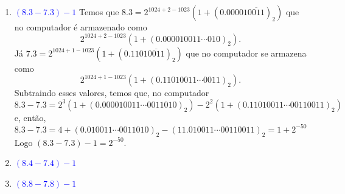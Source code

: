 \documentclass[a4paper,12pt]{article}
\theoremstyle{exer}
\theoremstyle{definition}
\newcommand{\enu}[1]{\textcolor{blue}{#1}}
\begin{document}
\begin{enumerate}
    \item \enu{$(8.3 - 7.3) - 1$} Temos que $8.3 = 2^{1024 + 2 - 1023}(1 +
    (0.00001\overline{0011})_2)$ que no computador é armazenado como 
    $$2^{1024 + 2 - 1023}(1 +
    (0.000010011\cdots 010)_2).$$ Já $7.3 = 2^{1024 + 1 - 1023}(1 +
    (0.1101\overline{0011})_2)$ que no computador se armazena como $$2^{1024 + 1 - 1023}(1 +
    (0.11010011\cdots 0011)_2).$$
    Subtraindo esses valores, temos que, no computador
    $$
    8.3 - 7.3 = 2^3(1 + (0.000010011\cdots 0011 010)_2) - 2^2(1 + (0.1101 0011 \cdots 0011 0011)_2)
    $$
    e, então, 
    $$
    8.3 - 7.3 = 4 + (0.010011\cdots 0011010)_2 - (11.010011\cdots 00110011)_2 = 1 + 2^{-50}
    $$
    Logo $(8.3 - 7.3) - 1 = 2^{-50}$.
    \item \enu{$(8.4 - 7.4) - 1$}
    \item \enu{$(8.8 - 7.8) - 1$}
\end{enumerate}
\end{document}
